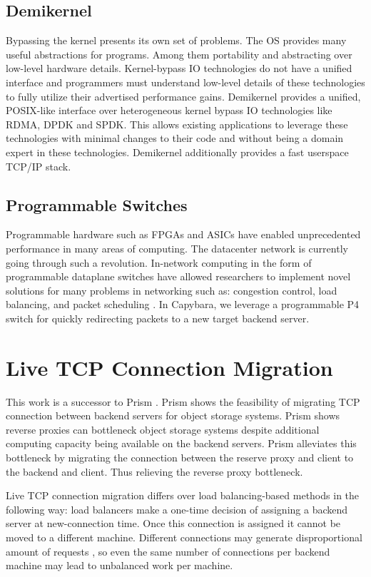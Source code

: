 \subsection{Demikernel}
Bypassing the kernel presents its own set of problems. The OS provides many useful abstractions for programs. Among them portability and abstracting over low-level hardware details. Kernel-bypass IO technologies do not have a unified interface and programmers must understand low-level details of these technologies to fully utilize their advertised performance gains. Demikernel \cite{demikernel} provides a unified, POSIX-like interface over heterogeneous kernel bypass IO technologies like RDMA, DPDK and SPDK. This allows existing applications to leverage these technologies with minimal changes to their code and without being a domain expert in these technologies. Demikernel additionally provides a fast userspace TCP/IP stack.

\subsection{Programmable Switches}
Programmable hardware such as FPGAs and ASICs have enabled unprecedented performance in many areas of computing. The datacenter network is currently going through such a revolution. In-network computing in the form of programmable dataplane switches have allowed researchers to implement novel solutions for many problems in networking such as: congestion control, load balancing,  and packet scheduling \cite{programmable-switch}. In Capybara, we leverage a programmable P4 switch for quickly redirecting packets to a new target backend server. 

\section{Live TCP Connection Migration}
This work is a successor to Prism \cite{prism}. Prism shows the feasibility of migrating TCP connection between backend servers for object storage systems. Prism shows reverse proxies can bottleneck object storage systems despite additional computing capacity being available on the backend servers. Prism alleviates this bottleneck by migrating the connection between the reserve proxy and client to the backend and client. Thus relieving the reverse proxy bottleneck.

Live TCP connection migration differs over load balancing-based methods \cite{load-balancing, crab-bypassing-lod-balancer} in the following way: load balancers make a one-time decision of assigning a backend server at new-connection time. Once this connection is assigned it cannot be moved to a different machine. Different connections may generate disproportional amount of requests \cite{pegasus}, so even the same number of connections per backend machine may lead to unbalanced work per machine.

